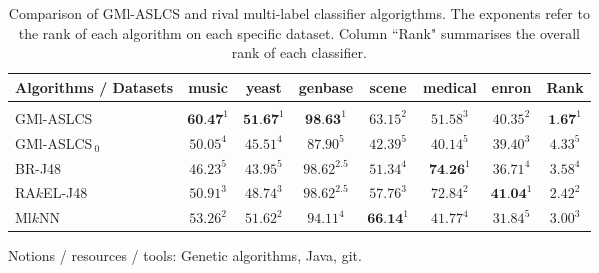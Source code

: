 \begin{table}[!h]
  \begin{center}
    \begin{tabular}{l|cccccc|c}
    Algorithms / Datasets& music     & yeast     & genbase       & scene     & medical   & enron     & Rank \\
    \hline \\ [-2ex]
    GMl-ASLCS         & $\textbf{60.47}^1$ & $\textbf{51.67}^1$ & $\textbf{98.63}^1$  & $63.15^2$ & $51.58^3$ & $40.35^2$ & $\textbf{1.67}^1$  \\
    GMl-ASLCS$_{\:0}$ & $50.05^4$ & $45.51^4$ & $87.90^5$     & $42.39^5$ & $40.14^5$ & $39.40^3$ & $4.33^5$      \\
    BR-J48            & $46.23^5$ & $43.95^5$ & $98.62^{2.5}$ & $51.34^4$ & $\textbf{74.26}^1$ & $36.71^4$ & $3.58^4$    \\
    RA$k$EL-J48       & $50.91^3$ & $48.74^3$ & $98.62^{2.5}$ & $57.76^3$ & $72.84^2$ & $\textbf{41.04}^1$ & $2.42^2$      \\
    Ml$k$NN           & $53.26^2$ & $51.62^2$ & $94.11^4$     & $\textbf{66.14}^1$ & $41.77^4$ & $31.84^5$ & $3.00^3$
    \\
    \end{tabular}
    \caption{Comparison of GMl-ASLCS and rival multi-label classifier algorigthms.
    The exponents refer to the rank of each algorithm on each specific dataset.
    Column ``Rank" summarises the overall rank of each classifier.}
	\label{table:accuracyBasedComparison}
    \end{center}
\end{table}

Notions / resources / tools: Genetic algorithms, Java, git.
